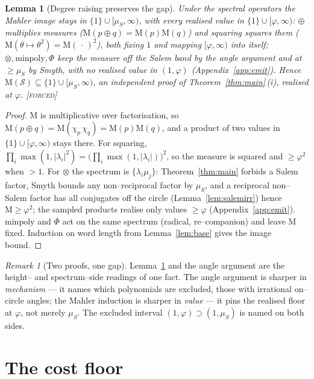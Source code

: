\documentclass[11pt]{article}
\theoremstyle{plain}
\newtheorem{lemma}[theorem]{Lemma}
\theoremstyle{definition}
\theoremstyle{remark}
\newtheorem{remark}[theorem]{Remark}
\newcommand{\forced}{\textcolor{forcedc}{\textsc{[forced]}}}
\newcommand{\Mah}{\mathrm{M}}
\newcommand{\charp}{\chi}
\newcommand{\abs}[1]{\left\lvert #1 \right\rvert}
\newcommand{\Scal}{\mathcal{S}}
\begin{document}
\begin{lemma}[Degree raising preserves the gap]\label{lem:degraise}
Under the spectral operators the Mahler image stays in $\{1\}\cup[\mu_S,\infty)$, with every realised value in $\{1\}\cup[\varphi,\infty)$: $\oplus$ multiplies measures ($\Mah(p\oplus q)=\Mah(p)\Mah(q)$) and squaring squares them ($\Mah(\theta\mapsto\theta^2)=\Mah(\,\cdot\,)^2$), both fixing $1$ and mapping $[\varphi,\infty)$ into itself; $\otimes,\mathrm{minpoly},\Phi$ keep the measure off the Salem band by the angle argument and at $\ge\mu_S$ by Smyth, with no realised value in $(1,\varphi)$ (Appendix~\ref{app:emit}). Hence $\Mah(\Scal)\subseteq\{1\}\cup[\mu_S,\infty)$, an independent proof of Theorem~\ref{thm:main}\,(i), realised at $\varphi$. \forced
\end{lemma}

\begin{proof}
$\Mah$ is multiplicative over factorisation, so $\Mah(p\oplus q)=\Mah(\charp_p\,\charp_q)=\Mah(p)\Mah(q)$, and a product of two values in $\{1\}\cup[\varphi,\infty)$ stays there. For squaring, $\prod_i\max(1,\abs{\lambda_i}^2)=\big(\prod_i\max(1,\abs{\lambda_i})\big)^2$, so the measure is squared and $\ge\varphi^2$ when $>1$. For $\otimes$ the spectrum is $\{\lambda_i\mu_j\}$: Theorem~\ref{thm:main} forbids a Salem factor, Smyth bounds any non--reciprocal factor by $\mu_S$, and a reciprocal non--Salem factor has all conjugates off the circle (Lemma~\ref{lem:salemirr}) hence $\Mah\ge\varphi^2$; the sampled products realise only values $\ge\varphi$ (Appendix~\ref{app:emit}). $\mathrm{minpoly}$ and $\Phi$ act on the same spectrum (radical, re--companion) and leave $\Mah$ fixed. Induction on word length from Lemma~\ref{lem:base} gives the image bound. \end{proof}

\begin{remark}[Two proofs, one gap]\label{rem:twoproofs}
Lemma~\ref{lem:degraise} and the angle argument are the height-- and spectrum--side readings of one fact. The angle argument is sharper in \emph{mechanism} --- it names which polynomials are excluded, those with irrational on--circle angles; the Mahler induction is sharper in \emph{value} --- it pins the realised floor at $\varphi$, not merely $\mu_S$. The excluded interval $(1,\varphi)\supset(1,\mu_S)$ is named on both sides.
\end{remark}

\section{The cost floor}\label{sec:floor}
\end{document}
